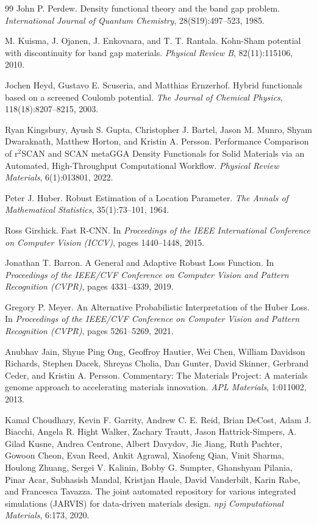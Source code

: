 \documentclass[a4paper,11pt]{article}
\begin{document}
\begin{thebibliography}{99}
John P. Perdew.
\newblock Density functional theory and the band gap problem.
\newblock \emph{International Journal of Quantum Chemistry}, 28(S19):497--523, 1985.

M. Kuisma, J. Ojanen, J. Enkovaara, and T. T. Rantala.
\newblock Kohn-Sham potential with discontinuity for band gap materials.
\newblock \emph{Physical Review B}, 82(11):115106, 2010.

Jochen Heyd, Gustavo E. Scuseria, and Matthias Ernzerhof.
\newblock Hybrid functionals based on a screened Coulomb potential.
\newblock \emph{The Journal of Chemical Physics}, 118(18):8207--8215, 2003.

Ryan Kingsbury, Ayush S. Gupta, Christopher J. Bartel, Jason M. Munro, Shyam Dwaraknath, Matthew Horton, and Kristin A. Persson.
\newblock Performance Comparison of r\(^2\)SCAN and SCAN metaGGA Density Functionals for Solid Materials via an Automated, High-Throughput Computational Workflow.
\newblock \emph{Physical Review Materials}, 6(1):013801, 2022.

Peter J. Huber.
\newblock Robust Estimation of a Location Parameter.
\newblock \emph{The Annals of Mathematical Statistics}, 35(1):73--101, 1964.

Ross Girshick.
\newblock Fast R-CNN.
\newblock In \emph{Proceedings of the IEEE International Conference on Computer Vision (ICCV)}, pages 1440--1448, 2015.

Jonathan T. Barron.
\newblock A General and Adaptive Robust Loss Function.
\newblock In \emph{Proceedings of the IEEE/CVF Conference on Computer Vision and Pattern Recognition (CVPR)}, pages 4331--4339, 2019.

Gregory P. Meyer.
\newblock An Alternative Probabilistic Interpretation of the Huber Loss.
\newblock In \emph{Proceedings of the IEEE/CVF Conference on Computer Vision and Pattern Recognition (CVPR)}, pages 5261--5269, 2021.

Anubhav Jain, Shyue Ping Ong, Geoffroy Hautier, Wei Chen, William Davidson Richards, Stephen Dacek, Shreyas Cholia, Dan Gunter, David Skinner, Gerbrand Ceder, and Kristin A. Persson.
\newblock Commentary: The Materials Project: A materials genome approach to accelerating materials innovation.
\newblock \emph{APL Materials}, 1:011002, 2013.

Kamal Choudhary, Kevin F. Garrity, Andrew C. E. Reid, Brian DeCost, Adam J. Biacchi, Angela R. Hight Walker, Zachary Trautt, Jason Hattrick-Simpers, A. Gilad Kusne, Andrea Centrone, Albert Davydov, Jie Jiang, Ruth Pachter, Gowoon Cheon, Evan Reed, Ankit Agrawal, Xiaofeng Qian, Vinit Sharma, Houlong Zhuang, Sergei V. Kalinin, Bobby G. Sumpter, Ghanshyam Pilania, Pinar Acar, Subhasish Mandal, Kristjan Haule, David Vanderbilt, Karin Rabe, and Francesca Tavazza.
\newblock The joint automated repository for various integrated simulations (JARVIS) for data-driven materials design.
\newblock \emph{npj Computational Materials}, 6:173, 2020.


\end{thebibliography}
\end{document}
